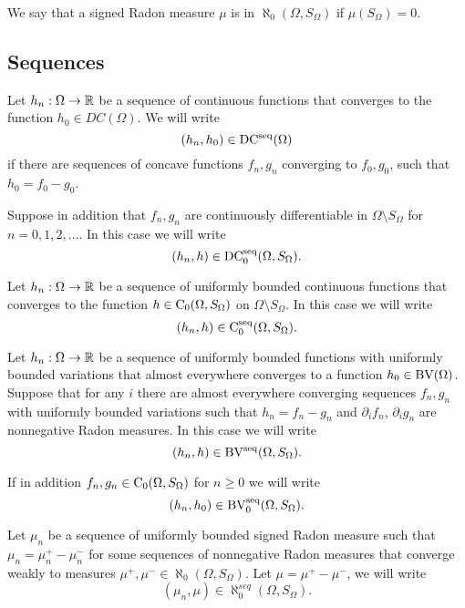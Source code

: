 We say that a signed Radon measure $\mu$ is in
$\aleph_0(\Omega,S_\Omega)$ if $\mu(S_\Omega)=0$.



\subsection{Sequences}
Let $h_n:\Omega\to\mathbb{R}$ be a sequence of continuous functions that
converges to the function $h_0\in DC(\Omega)$.
We will write 
$$(h_n,h_0)\in \operatorname{DC^{seq}}(\Omega)$$
if
there are sequences of concave functions $f_n,g_n$ converging to
$f_0,g_0$, such that 
$h_0=f_0-g_0$.

Suppose in addition that 
$f_n,g_n$ are  continuously differentiable in
$\Omega\setminus S_\Omega$ for $n=0,1,2,\dots$.
In this case we will write 
$$(h_n,h)\in \operatorname{DC_0^{seq}}(\Omega,S_\Omega).$$



Let $h_n:\Omega\to\mathbb{R}$ be a sequence of
uniformly bounded continuous 
functions
that
converges  to the function $h\in \operatorname{C_0}(\Omega,S_\Omega)$
 on
$\Omega\setminus S_\Omega$.
In this case we will write 
$$(h_n,h)\in \operatorname{C_0^{seq}}(\Omega,S_\Omega).$$

Let $h_n:\Omega\to\mathbb{R}$ be a sequence of uniformly bounded functions
with uniformly bounded variations
that
almost everywhere converges  to a function $h_0\in\operatorname{BV}(\Omega)$.
 Suppose that for any $i$ there are
 almost everywhere converging  sequences
 $f_n, g_n$ with uniformly bounded variations
  such that 
 $h_n=f_n- g_n$ and
 $\partial_i f_n$,
 $\partial_i  g_n$ are
 nonnegative Radon measures.
  In this case we will write 
$$(h_n,h)\in \operatorname{BV^{seq}}(\Omega,S_\Omega).$$

If in addition $f_n, g_n\in\operatorname{C_0}(\Omega,S_\Omega)$ for
$n\ge 0$ we
will write 
$$(h_n,h_0)\in \operatorname{BV_0^{seq}}(\Omega,S_\Omega).$$





Let $\mu_n$ be
  a sequence of uniformly bounded
signed Radon measure  such that
$\mu_n=\mu_n^+-\mu_n^-$
for some
sequences of nonnegative Radon measures
that converge weakly to measures $\mu^+,
\mu^-\in\aleph_0(\Omega,S_\Omega)$.
Let $\mu=\mu^+-\mu^-$,
we will write
$$(\mu_n,\mu)\in\aleph_0^{seq}(\Omega,S_\Omega).$$


